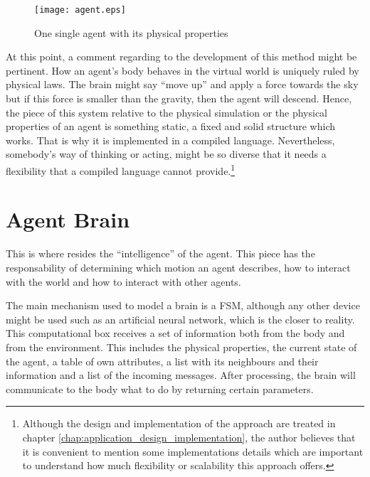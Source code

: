 \begin{figure}[!htb]
  \centering
  \texttt{[image: agent.eps]}
  \caption{One single agent with its physical properties}
  \label{fig:navigation}
\end{figure}

At this point, a comment regarding to the development of this method might be pertinent. How an agent's body behaves in the virtual world is uniquely ruled by physical laws. The brain might say ``move up'' and apply a force towards the sky but if this force is smaller than the gravity, then the agent will descend. Hence, the piece of this system relative to the physical simulation or the physical properties of an agent is something static, a fixed and solid structure which works. That is why it is implemented in a compiled language. Nevertheless, somebody's way of thinking or acting, might be so diverse that it needs a flexibility that a compiled language cannot provide.\footnote{Although the design and implementation of the approach are treated in chapter \ref{chap:application_design_implementation}, the author believes that it is convenient to mention some implementations details which are important to understand how much flexibility or scalability this approach offers.}

\section{Agent Brain}
This is where resides the ``intelligence'' of the agent. This piece has the responsability of determining which motion an agent describes, how to interact with the world and how to interact with other agents.

The main mechanism used to model a brain is a FSM, although any other device might be used such as an artificial neural network, which is the closer to reality. This computational box receives a set of information both from the body and from the environment. This includes the physical properties, the current state of the agent, a table of own attributes, a list with its neighbours and their information and a list of the incoming messages. After processing, the brain will communicate to the body what to do by returning certain parameters.

